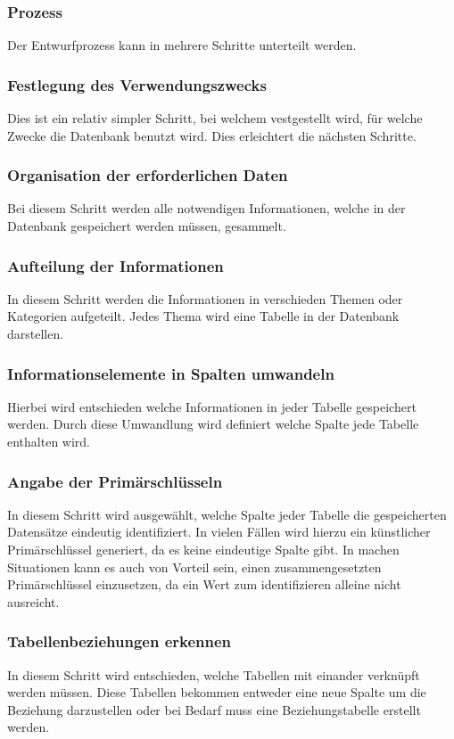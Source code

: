 			\subsubsection{Prozess}
				Der Entwurfprozess kann in mehrere Schritte unterteilt werden.
			\subsubsection{Festlegung des Verwendungszwecks}
				Dies ist ein relativ simpler Schritt, bei welchem vestgestellt wird, für welche Zwecke die Datenbank benutzt wird. Dies erleichtert die nächsten Schritte.
			\subsubsection{Organisation der erforderlichen Daten}
				Bei diesem Schritt werden alle notwendigen Informationen, welche in der Datenbank gespeichert werden müssen, gesammelt.
			\subsubsection{Aufteilung der Informationen}
				In diesem Schritt werden die Informationen in verschieden Themen oder Kategorien aufgeteilt. Jedes Thema wird eine Tabelle in der Datenbank darstellen.
			\subsubsection{Informationselemente in Spalten umwandeln}
				Hierbei wird entschieden welche Informationen in jeder Tabelle gespeichert werden. Durch diese Umwandlung wird definiert welche Spalte jede Tabelle enthalten wird.
			\subsubsection{Angabe der Primärschlüsseln}
				In diesem Schritt wird ausgewählt, welche Spalte jeder Tabelle die gespeicherten Datensätze eindeutig identifiziert. In vielen Fällen wird hierzu ein künstlicher Primärschlüssel generiert, da es keine eindeutige Spalte gibt. 
				In machen Situationen kann es auch von Vorteil sein, einen zusammengesetzten Primärschlüssel einzusetzen, da ein Wert zum identifizieren alleine nicht ausreicht.
			\subsubsection{Tabellenbeziehungen erkennen}
				In diesem Schritt wird entschieden, welche Tabellen mit einander verknüpft werden müssen. Diese Tabellen bekommen entweder eine neue Spalte um die Beziehung darzustellen oder bei Bedarf muss eine Beziehungstabelle erstellt werden.
